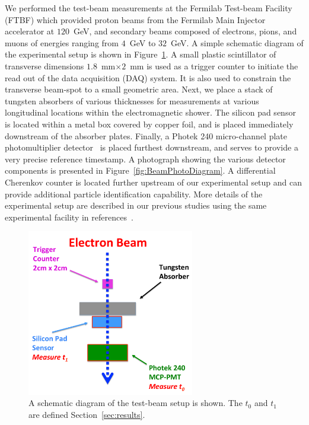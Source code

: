 \documentclass[12pt]{article}
\begin{document}
{We performed the test-beam measurements at the Fermilab Test-beam Facility (FTBF) which provided
proton beams from the Fermilab Main Injector accelerator at $120$~GeV, and secondary beams composed
of electrons, pions, and muons of energies ranging from $4$~GeV to $32$~GeV. A simple schematic diagram
of the experimental setup is shown in Figure~\ref{fig:BeamSchematicDiagram}. A small plastic scintillator 
of transverse dimensions $1.8$~mm$\times 2$~mm is used as a trigger counter to initiate the read out of
the data acquisition (DAQ) system. It is also used to constrain the transverse beam-spot to a small geometric area. 
Next, we place a stack of tungsten absorbers of various thicknesses for measurements at various
longitudinal locations within the electromagnetic shower. The silicon pad sensor is located within a metal
box covered by copper foil, and is placed immediately downstream of the absorber plates. Finally, a 
Photek 240 micro-channel plate photomultiplier detector~\cite{Anderson:2015gha, MCPFastCaloNIMA, Ronzhin2015288,Ronzhin201552} is placed furthest downstream, and serves to provide
a very precise reference timestamp. A photograph showing the various detector components is presented
in Figure~\ref{fig:BeamPhotoDiagram}. A differential Cherenkov counter is located further upstream of our
experimental setup and can provide additional particle identification capability. More details of
the experimental setup are described in our previous studies using the same experimental facility in
references~\cite{Anderson:2015gha, MCPFastCaloNIMA, Ronzhin2015288,Ronzhin201552}.

\begin{figure}[htbp] 
\centering
\includegraphics[width=0.65\textwidth]{plots/BeamSchematicDiagram.pdf} 
\caption{A schematic diagram of the test-beam setup is shown. The $t_0$ and $t_1$ are defined Section~\ref{sec:results}.} 
\label{fig:BeamSchematicDiagram} 
\end{figure} 

}
\end{document}
